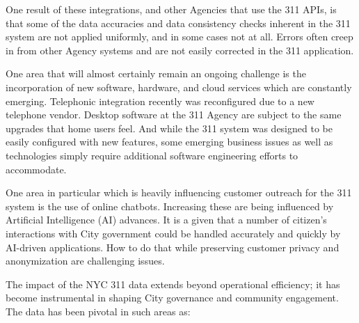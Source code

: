 \documentclass[12pt, titlepage]{article}
\begin{document}
One result of these integrations, and other Agencies that use the 311 APIs, is that some of the data accuracies
and data consistency checks inherent in the 311 system are not applied uniformly, and in some cases not at all.
Errors often creep in from other Agency systems and are not easily corrected in the 311 application.

One area that will almost certainly remain an ongoing challenge is the incorporation of new software, hardware,
and cloud services which are constantly emerging.  Telephonic integration recently was reconfigured due to a new
telephone vendor. Desktop software at the 311 Agency are subject to the same upgrades that home users feel. And while the 
311 system was designed to be easily configured with new features, some emerging business issues as well as
technologies simply require additional software engineering efforts to accommodate.

One area in particular which is heavily influencing customer outreach for the 311 system is the use of
online chatbots. Increasing these are being influenced by Artificial Intelligence (AI) advances. It is a given that
a number of citizen's interactions with City government could be handled accurately and quickly by AI-driven
applications. How to do that while preserving customer privacy and anonymization are challenging issues. 	

The impact of the NYC 311 data extends beyond operational efficiency;
it has become instrumental in shaping City governance and community
engagement. The data has been pivotal in such areas as:
\end{document}
